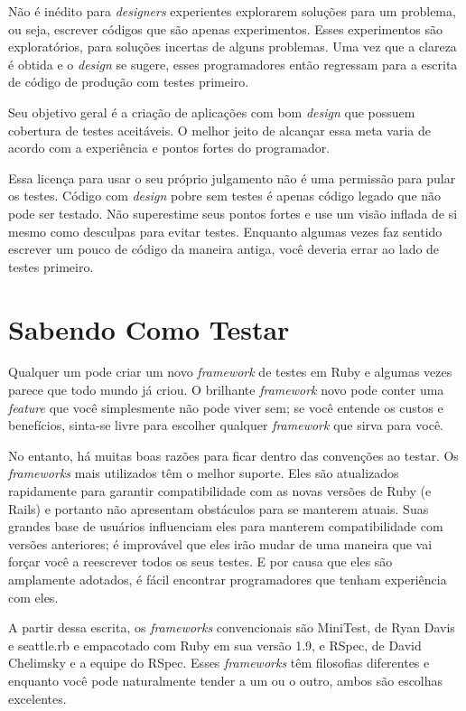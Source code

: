 Não é inédito para \textit{designers} experientes explorarem soluções para um problema, ou seja, escrever códigos que são apenas experimentos. Esses experimentos são exploratórios, para soluções incertas de alguns problemas. Uma vez que a clareza é obtida e o \textit{design} se sugere, esses programadores então regressam para a escrita de código de produção com testes primeiro.

Seu objetivo geral é a criação de aplicações com bom \textit{design} que possuem cobertura de testes aceitáveis. O melhor jeito de alcançar essa meta varia de acordo com a experiência e pontos fortes do programador.

Essa licença para usar o seu próprio julgamento não é uma permissão para pular os testes. Código com \textit{design} pobre sem testes é apenas código legado que não pode ser testado. Não superestime seus pontos fortes e use um visão inflada de si mesmo como desculpas para evitar testes. Enquanto algumas vezes faz sentido escrever um pouco de código da maneira antiga, você deveria errar ao lado de testes primeiro.

\section{Sabendo Como Testar}

Qualquer um pode criar um novo \textit{framework} de testes em Ruby e algumas vezes parece que todo mundo já criou. O brilhante \textit{framework} novo pode conter uma \textit{feature} que você simplesmente não pode viver sem; se você entende os custos e benefícios, sinta-se livre para escolher qualquer \textit{framework} que sirva para você.

No entanto, há muitas boas razões para ficar dentro das convenções ao testar. Os \textit{frameworks} mais utilizados têm o melhor suporte. Eles são atualizados rapidamente para garantir compatibilidade com as novas versões de Ruby (e Rails) e portanto não apresentam obstáculos para se manterem atuais. Suas grandes base de usuários influenciam eles para manterem compatibilidade com versões anteriores; é improvável que eles irão mudar de uma maneira que vai forçar você a reescrever todos os seus testes. E por causa que eles são amplamente adotados, é fácil encontrar programadores que tenham experiência com eles.

A partir dessa escrita, os \textit{frameworks} convencionais são MiniTest, de Ryan Davis e seattle.rb e empacotado com Ruby em sua versão 1.9, e RSpec, de David Chelimsky e a equipe do RSpec. Esses \textit{frameworks} têm filosofias diferentes e enquanto você pode naturalmente tender a um ou o outro, ambos são escolhas excelentes.


